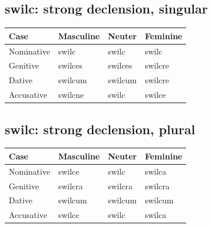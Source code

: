 \subsection*{swilc: strong declension, singular}

\par\begingroup
\fontsize{10.5}{13.2}\selectfont
\setlength{\LTleft}{0pt}\setlength{\LTright}{\fill}
\noindent
\begin{tabular}{@{}>{\raggedright\arraybackslash}p{28.89mm}>{\raggedright\arraybackslash}p{28.89mm}>{\raggedright\arraybackslash}p{28.89mm}>{\raggedright\arraybackslash}p{28.89mm}@{}}
\toprule
\textbf{Case} & \textbf{Masculine} & \textbf{Neuter} & \textbf{Feminine} \\
\midrule
Nominative & swilc & swilc & swilc \\
Genitive & swilces & swilces & swilcre \\
Dative & swilcum & swilcum & swilcre \\
Accusative & swilcne & swilc & swilce \\
\bottomrule
\end{tabular}
\par\endgroup

\subsection*{swilc: strong declension, plural}

\par\begingroup
\fontsize{10.5}{13.2}\selectfont
\setlength{\LTleft}{0pt}\setlength{\LTright}{\fill}
\noindent
\begin{tabular}{@{}>{\raggedright\arraybackslash}p{28.89mm}>{\raggedright\arraybackslash}p{28.89mm}>{\raggedright\arraybackslash}p{28.89mm}>{\raggedright\arraybackslash}p{28.89mm}@{}}
\toprule
\textbf{Case} & \textbf{Masculine} & \textbf{Neuter} & \textbf{Feminine} \\
\midrule
Nominative & swilce & swilc & swilca \\
Genitive & swilcra & swilcra & swilcra \\
Dative & swilcum & swilcum & swilcum \\
Accusative & swilce & swilc & swilca \\
\bottomrule
\end{tabular}
\par\endgroup

